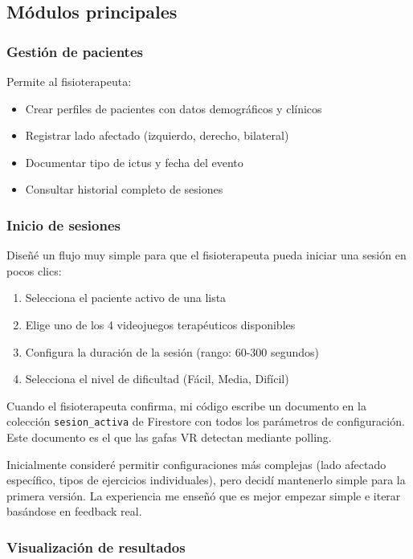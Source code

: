 \subsection{Módulos principales}

\subsubsection{Gestión de pacientes}

Permite al fisioterapeuta:
\begin{itemize}
    \item Crear perfiles de pacientes con datos demográficos y clínicos
    \item Registrar lado afectado (izquierdo, derecho, bilateral)
    \item Documentar tipo de ictus y fecha del evento
    \item Consultar historial completo de sesiones
\end{itemize}

\subsubsection{Inicio de sesiones}

Diseñé un flujo muy simple para que el fisioterapeuta pueda iniciar una sesión en pocos clics:

\begin{enumerate}
    \item Selecciona el paciente activo de una lista
    \item Elige uno de los 4 videojuegos terapéuticos disponibles
    \item Configura la duración de la sesión (rango: 60-300 segundos)
    \item Selecciona el nivel de dificultad (Fácil, Media, Difícil)
\end{enumerate}

Cuando el fisioterapeuta confirma, mi código escribe un documento en la colección \texttt{sesion\_activa} de Firestore con todos los parámetros de configuración. Este documento es el que las gafas VR detectan mediante polling.

Inicialmente consideré permitir configuraciones más complejas (lado afectado específico, tipos de ejercicios individuales), pero decidí mantenerlo simple para la primera versión. La experiencia me enseñó que es mejor empezar simple e iterar basándose en feedback real.

\subsubsection{Visualización de resultados}

